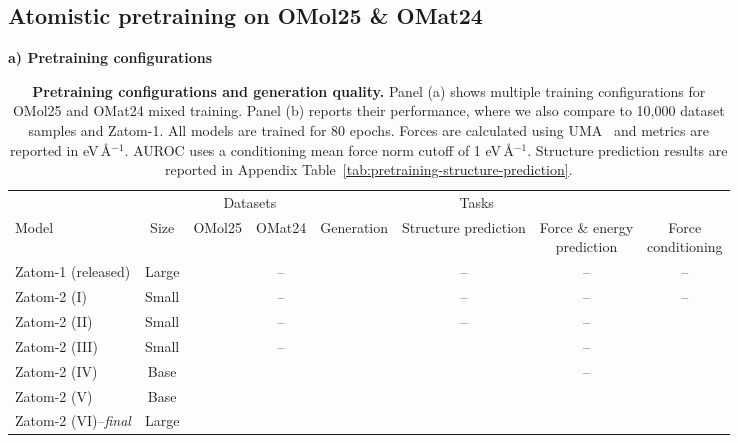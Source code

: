 \documentclass{article} %
\begin{document}
\subsection{Atomistic pretraining on OMol25 \& OMat24}
\label{sec:results-pretraining}

\begin{table}[htbp]
  \centering
  \scriptsize
  \newcommand{\tablecheckmark}{%
    \textcolor{green!50!black}{\scalebox{1.2}{$\checkmark$}}%
  }
  \renewcommand{\arraystretch}{0.85}
  \caption{\textbf{Pretraining configurations and generation quality.}
  Panel (a) shows multiple training configurations for OMol25 and OMat24 mixed training. Panel (b) reports their performance, where we also compare to 10,000 dataset samples and Zatom-1. All models are trained for 80 epochs. Forces are calculated using UMA~\citep{wood2025uma} and metrics are reported in eV\,\AA$^{-1}$. AUROC uses a conditioning mean force norm cutoff of 1 eV\,\AA$^{-1}$. Structure prediction results are reported in Appendix
  Table~\ref{tab:pretraining-structure-prediction}.}
  \label{tab:pretraining-quality}
  \vspace{0.4em}

  {\textbf{a) Pretraining configurations}\par}
  \vspace{0.25em}
  \begin{tabular}{@{}lccccccc@{}}
    \toprule
    & & \multicolumn{2}{c}{Datasets} & \multicolumn{3}{c}{Tasks} & \\
    \cmidrule(lr){3-4}\cmidrule(lr){5-7}
    Model & Size & OMol25 & OMat24 & Generation & Structure prediction &
    \shortstack{Force \& energy\\prediction} & \shortstack{Force\\conditioning} \\
    \midrule
    Zatom-1 (released) & Large & \tablecheckmark & -- & \tablecheckmark & -- & -- & -- \\
    \midrule
    Zatom-2 (I) & Small & \tablecheckmark & -- & \tablecheckmark & -- & -- & -- \\
    Zatom-2 (II) & Small & \tablecheckmark & -- & \tablecheckmark & -- & -- & \tablecheckmark \\
    Zatom-2 (III) & Small & \tablecheckmark & -- & \tablecheckmark & \tablecheckmark & -- & \tablecheckmark \\
    \midrule
    Zatom-2 (IV) & Base & \tablecheckmark & \tablecheckmark & \tablecheckmark & \tablecheckmark & -- & \tablecheckmark \\
    Zatom-2 (V) & Base & \tablecheckmark & \tablecheckmark & \tablecheckmark & \tablecheckmark & \tablecheckmark & \tablecheckmark \\
    \midrule
    Zatom-2 (VI)--\textit{final} & Large & \tablecheckmark & \tablecheckmark & \tablecheckmark & \tablecheckmark & \tablecheckmark & \tablecheckmark \\
    \bottomrule
  \end{tabular}


\end{table}
\end{document}
